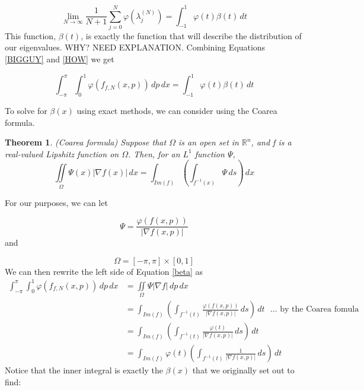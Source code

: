 \documentclass{article}
\newtheorem{theorem}{Theorem}[section]
\begin{document}
\begin{equation}
\lim_{N \to \infty} \frac{1}{N+1}  \displaystyle\sum\limits_{j=0}^N \varphi(\lambda_{j}^{(N)}) = \int^1_{-1} \varphi(t) \beta (t) \,dt \label{HOW}
\end{equation} This function, $\beta(t)$, is exactly the function that will describe the distribution of our eigenvalues. WHY? NEED EXPLANATION.  Combining Equations \ref{BIGGUY} and \ref{HOW} we get 

\begin{equation} 
\int^{\pi}_{-\pi} \! \int^1_0  \varphi(f_{f,N}(x,p)) \,dp \,dx = \int^1_{-1} \varphi(t) \beta (t) \,dt \label{beta} 
\end{equation}

To solve for $\beta(x)$  using exact methods, we can consider using the Coarea formula.

\begin{theorem}
\emph{(Coarea formula)} \label{coarea}
Suppose that $\Omega$ is an open set in $\mathbb{R}^{n}$, and f is a real-valued Lipshitz function on $\Omega$.  Then, for an $L^{1}$ function $\Psi$,
\begin{equation}
\iint\limits_\Omega \Psi(x)\lvert\nabla f(x)\rvert \,dx =  \int_{Im(f)} \! (\int_{f^{-1}(x)} \Psi \,ds) \,dx
\end{equation}
\end{theorem}

For our purposes, we can let 

\begin{equation} 
\Psi = \frac{\varphi(f(x,p))}{\lvert\nabla f(x,p)\rvert} 
\end{equation} and 

\begin{equation} 
\Omega = [-\pi,\pi] \times [0,1] 
\end{equation} We can then rewrite the left side of Equation \ref{beta} as 
\begin{equation} \begin{split} 
\int^{\pi}_{-\pi} \! \int^1_0  \varphi(f_{f,N}(x,p)) \,dp \,dx& =  \iint\limits_\Omega \Psi\lvert\nabla f \rvert\, dp \, dx  \\ 
& = \int_{Im(f)} \! \left(\int_{f^{-1}(t)} \frac{\varphi(f(x,p))}{\lvert\nabla f(x,p)\rvert} \,ds\right) \,dt    \text{ $...$ by the Coarea fomula} \\
& = \int_{Im(f)} \! \left(\int_{f^{-1}(t)} \frac{\varphi(t)}{\lvert\nabla f(x,p)\rvert} \,ds\right) \,dt\\ & = \int_{Im(f)} \varphi(t) \! \left(\int_{f^{-1}(t)} \frac{1}{\lvert\nabla f(x,p)\rvert} \,ds\right) \,dt \end{split} 
\end{equation} Notice that the inner integral is exactly the $\beta(x)$ that we originally set out to find:
\end{document}
